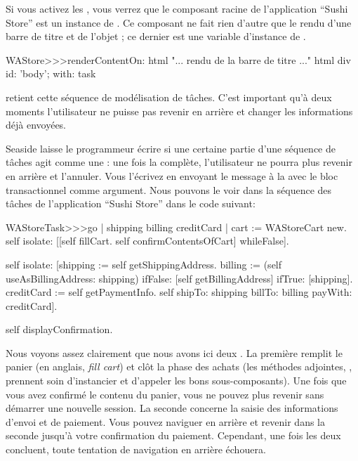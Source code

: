 \documentclass[a4paper,10pt,twoside]{book}
\begin{document}
Si vous activez les , vous verrez que le
composant racine de l'application ``Sushi Store'' est un instance de
.
Ce composant ne fait rien d'autre que le rendu d'une barre de titre et
de l'objet ; ce dernier est une variable d'instance de
.

\begin{code}{}
WAStore>>>renderContentOn: html
	"... rendu de la barre de titre ..."
	html div id: 'body'; with: task
\end{code}

 retient cette séquence de modélisation de tâches.
C'est important qu'à deux moments l'utilisateur ne puisse pas revenir
en arrière et changer les informations déjà envoyées.


Seaside laisse le programmeur écrire si une certaine partie d'une
séquence de tâches agit comme une \transaction: une fois la
\transaction complète, l'utilisateur ne pourra plus revenir en arrière
et l'annuler.
Vous l'écrivez en envoyant le message  à
la \task avec le bloc transactionnel comme argument.
Nous pouvons le voir dans la séquence des tâches de l'application
``Sushi Store'' dans le code suivant:

\begin{code}{}
WAStoreTask>>>go
	| shipping billing creditCard |
	cart := WAStoreCart new.
	self isolate:
		[[self fillCart.
		self confirmContentsOfCart]
			whileFalse].

	self isolate:
		[shipping := self getShippingAddress.
		billing := (self useAsBillingAddress: shipping)
					ifFalse: [self getBillingAddress]
					ifTrue: [shipping].
		creditCard := self getPaymentInfo.
		self shipTo: shipping billTo: billing payWith: creditCard].

	self displayConfirmation.
\end{code}

Nous voyons assez clairement que nous avons ici deux \transactions.
La première remplit le panier (en anglais, \emph{fill cart}) et clôt
la phase des achats (les méthodes adjointes,  \etc,
prennent soin d'instancier et d'appeler les bons sous-composants).
Une fois que vous avez confirmé le contenu du panier, vous ne pouvez
plus revenir sans démarrer une nouvelle session.
La seconde \transaction concerne la saisie des informations d'envoi et
de paiement.
Vous pouvez naviguer en arrière et revenir dans la seconde
\transaction{} jusqu'à votre confirmation du paiement.
Cependant, une fois les deux \transaction{} concluent, toute tentation
de navigation en arrière échouera.
\end{document}
